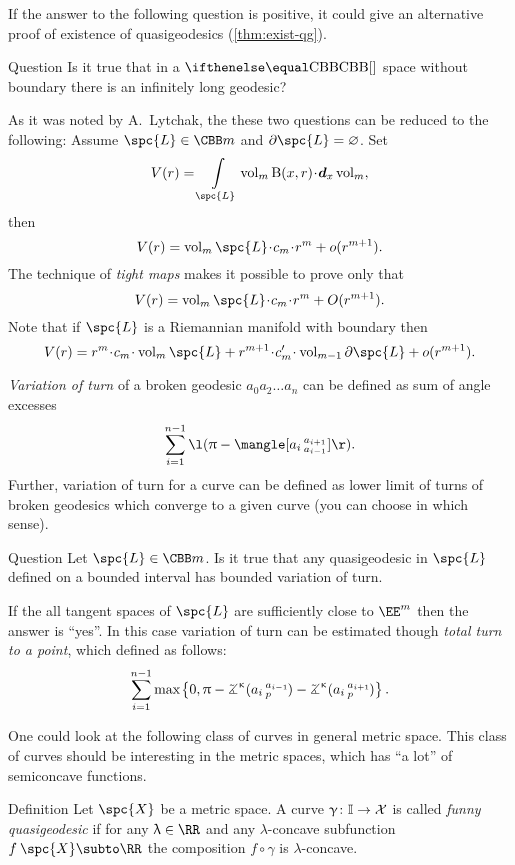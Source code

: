If the answer to the following question is positive, it could give an alternative proof of existence of quasigeodesics (\ref{thm:exist-qg}).

\begin{thm}{Question}
Is it true that in a $\Alex{}$ space without boundary there is an infinitely long geodesic?
\end{thm}


As it was noted by A.~Lytchak, the these two questions can be reduced to the following:
Assume $\spc{L}\in\CBB m{}$ and $\partial \spc{L}=\emptyset$. 
Set
\[V(r)=\int\limits_\spc{L}\vol_m\oBall(x,r)\cdot\d_x\vol_m,\]
then \[V(r)=\vol_m\spc{L}\cdot\Const_m\cdot r^m+o(r^{m+1}).\]
The technique of \emph{tight maps} makes it possible to prove only that
\[V(r)=\vol_m\spc{L}\cdot\Const_m\cdot r^m+O(r^{m+1}).\]
Note that if $\spc{L}$ is a Riemannian manifold with boundary then 
\[V(r)
=
r^m\cdot\Const_m\cdot\vol_m \spc{L} +r^{m+1}\cdot\Const'_m\cdot\vol_{m-1}\partial \spc{L}
+o(r^{m+1}).\]

\smallskip

\emph{Variation of turn} of a broken geodesic $a_0 a_2\dots a_n$ can be defined as sum of angle excesses
\[\sum_{i=1}^{n-1}\l(\pi-\mangle\hinge{a_i}{a_{i+1}}{a_{i-1}}\r).\]
Further, variation of turn for a curve can be defined as lower limit of turns of broken geodesics which converge to a given curve (you can choose in which sense).

\begin{thm}{Question}
Let $\spc{L}\in\CBB m{}$.
Is it true that any quasigeodesic in $\spc{L}$ defined on a bounded interval has bounded variation of turn.
\end{thm}

If the all tangent spaces of $\spc{L}$ are sufficiently close to $\EE^m$ then the answer is ``yes''.
In this case variation of turn can be estimated though \emph{total turn to a point}, which defined as follows:
\[\sum_{i=1}^{n-1}\max\l\{0,\pi-\angk\kappa{a_i}{a_{i-1}}{p}-\angk\kappa{a_i}{a_{i+1}}{p}\r\}.\]






One could look at the following class of curves in general metric space.
This class of curves should be interesting in the metric spaces, which has ``a lot'' of semiconcave functions.

\begin{thm}{Definition}
Let $\spc{X}$ be a metric space.
A curve $\gamma\:\II\to \spc{X}$ is called \emph{funny quasigeodesic} if for any $\lambda\in\RR$ and any $\lambda$-concave subfunction $f\:\spc{X}\subto \RR$ the composition $f\circ\gamma$ is $\lambda$-concave.
\end{thm}

